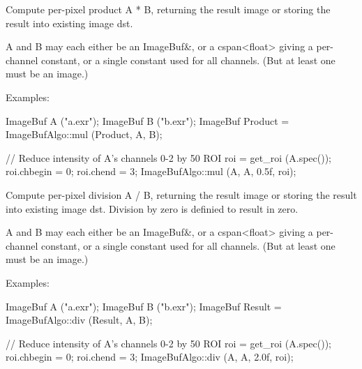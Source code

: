Compute per-pixel product {\cf A * B}, returning the result image
or storing the result into existing image {\cf dst}.

{\cf A} and {\cf B} may each either be an {\cf ImageBuf\&}, or a
{\cf cspan<float>} giving a per-channel constant, or a single constant used
for all channels. (But at least one must be an image.)

\smallskip
\noindent Examples:
\begin{code}
    ImageBuf A ("a.exr");
    ImageBuf B ("b.exr");
    ImageBuf Product = ImageBufAlgo::mul (Product, A, B);

    // Reduce intensity of A's channels 0-2 by 50%
    ROI roi = get_roi (A.spec());
    roi.chbegin = 0;  roi.chend = 3;
    ImageBufAlgo::mul (A, A, 0.5f, roi);
\end{code}
\apiend


 

Compute per-pixel division {\cf A / B}, returning the result image
or storing the result into existing image {\cf dst}.
Division by zero is definied to result in zero.

{\cf A} and {\cf B} may each either be an {\cf ImageBuf\&}, or a
{\cf cspan<float>} giving a per-channel constant, or a single constant used
for all channels. (But at least one must be an image.)

\smallskip
\noindent Examples:
\begin{code}
    ImageBuf A ("a.exr");
    ImageBuf B ("b.exr");
    ImageBuf Result = ImageBufAlgo::div (Result, A, B);

    // Reduce intensity of A's channels 0-2 by 50%
    ROI roi = get_roi (A.spec());
    roi.chbegin = 0;  roi.chend = 3;
    ImageBufAlgo::div (A, A, 2.0f, roi);
\end{code}
\apiend


 

